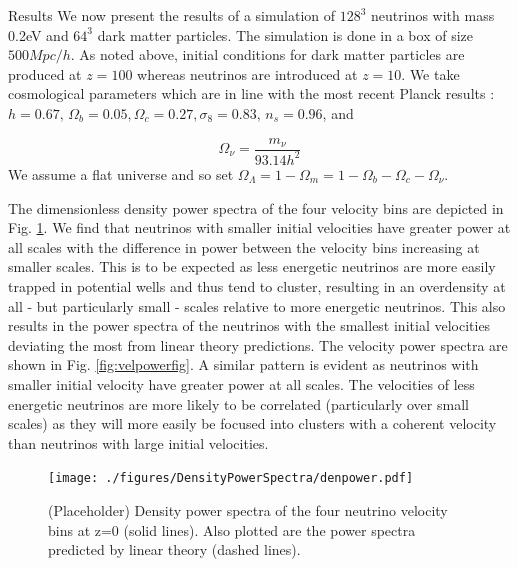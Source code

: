 \begin{section}{Results}
  \label{sec:results}
  We now present the results of a simulation of $128^3$ neutrinos 
with mass 0.2eV and $64^3$ dark matter particles. The simulation 
is done in a box of size $500 Mpc/h$. As noted above, initial 
conditions for dark matter particles are produced at $z=100$ 
whereas neutrinos are introduced at $z=10$. We take cosmological 
parameters which are in line with the most recent Planck results 
\cite{bib:Planck2015}: $h=0.67,\, \Omega_b=0.05, \Omega_c=0.27, 
\sigma_8=0.83,\, n_s=0.96 $, and

\begin{equation}
  \Omega_\nu = \frac{m_\nu}{93.14 h^2}
\end{equation}
We assume a flat universe and so set $\Omega_\Lambda=1-\Omega_m=1-\Omega_b-\Omega_c-\Omega_\nu$.

\par The dimensionless density power spectra of the four velocity 
bins are depicted in Fig. \ref{fig:denpowerfig}. We find that 
neutrinos with smaller initial velocities have greater power at all scales 
with the difference in power between the velocity bins increasing at smaller scales. 
This is to be expected as less energetic neutrinos are more easily trapped 
in potential wells and thus tend to cluster, resulting in an overdensity at all -
but particularly small - scales relative to more energetic neutrinos. 
This also results in the power spectra of the neutrinos with the 
smallest initial velocities deviating the most from linear theory predictions. 
The velocity power spectra are shown in Fig. \ref{fig:velpowerfig}.
A similar pattern is evident as neutrinos with smaller initial velocity have
greater power at all scales. The velocities of less energetic neutrinos are
more likely to be correlated (particularly over small scales) as they will
more easily be focused into clusters with a coherent velocity than neutrinos
with large initial velocities. 

\begin{figure}[htbp]
  \begin{center}
    \texttt{[image: ./figures/DensityPowerSpectra/denpower.pdf]}
    \caption{(Placeholder) Density power spectra of the four neutrino velocity bins
	      at z=0 (solid lines). Also plotted are the power spectra predicted by
	      linear theory (dashed lines).}
    \label{fig:denpowerfig}
  \end{center}
\end{figure}


\end{section}
